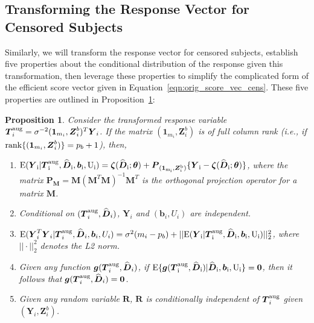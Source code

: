 \documentclass[12pt]{article}
\def\bzero{{\mathbf 0}}
\newcommand{\bzeta}{\mbox{\boldmath $\zeta$}}
\def\btheta{{\boldsymbol{\theta}}}
\def\bzero{{\boldsymbol{0}}}
\def\bone{{\boldsymbol{1}}}
\def\bb{{\boldsymbol b}}
\def\bg{{\boldsymbol g}}
\def\bD{{\boldsymbol D}}
\def\bM{{\boldsymbol M}}
\def\bP{{\boldsymbol P}}
\def\bR{{\boldsymbol R}}
\def\bT{{\boldsymbol T}}
\def\bY{{\boldsymbol Y}}
\def\bZ{{\boldsymbol Z}}
\def\tilD{\bD}
\def\E{\rm E}
\newtheorem{proposition}{Proposition}
\begin{document}
\subsection{Transforming the Response Vector for Censored Subjects}
\label{sec:simplify_score_vector_cens}

Similarly, we will transform the response vector for censored subjects, establish five properties about the conditional distribution of the response given this transformation, then leverage these properties to simplify the complicated form of the efficient score vector given in Equation~\eqref{eqn:orig_score_vec_cens}. These five properties are outlined in Proposition~\ref{prop:three_properties_cens}:
\begin{proposition}
\label{prop:three_properties_cens}
Consider the transformed response variable $\bT_i^{\rm aug}=\sigma^{-2}(\bone_{m_i},\bZ_i^b)^T\bY_i$. If the matrix $(\bone_{m_i},\bZ_i^b)$ is of full column rank (i.e., if ${\rm rank}\{(\bone_{m_i},\bZ_i^b)\}=p_b+1$), then,
\begin{enumerate}
    \item[$\rm{P1}^*$] $\rm{E}(\bY_i|\bT_i^{\rm aug},\widehat{\tilD}_i,\bb_i,U_i)=\bzeta(\widehat{\tilD}_i;\btheta)+\bP_{(\bone_{m_i},\bZ_i^b)}\{\bY_i-\bzeta(\widehat{\tilD}_i;\btheta)\}$, where the matrix $\bP_{\bM} = \bM(\bM^T\bM)^{-1}\bM^T$ is the orthogonal projection operator for a matrix $\bM$.
    \item[$\rm{P2}^*$] Conditional on $(\bT_i^{\rm aug},\widehat{\tilD}_i)$, $\bY_i$ and $(\bb_i,U_i)$ are independent.
    \item[${\rm P3}^*$] ${\rm E}(\bY_i^T\bY_i|\bT_i^{\rm aug},\widehat{\tilD}_i,\bb_i,U_i)=\sigma^2(m_i-p_b)+||\rm{E}(\bY_i|\bT_i^{\rm aug},\widehat{\tilD}_i,\bb_i,U_i)||^2_2$, where $||\cdot||^2_2$ denotes the L2 norm.
    \item[${\rm P4}^*$] Given any function $\bg(\bT_i^{\rm aug},\widehat{\tilD}_i)$, if $\E\{\bg(\bT_i^{\rm aug},\widehat{\tilD}_i)|\widehat{\tilD}_i,\bb_i,U_i\}=\bzero$, then it follows that $\bg(\bT_i^{\rm aug},\widehat{\tilD}_i)=\bzero$.
    \item[${\rm P5}^*$] Given any random variable $\bR$, $\bR$ is conditionally independent of $\bT_i^{\rm aug}$ given $(\bY_i, \bZ_i^b)$.
\end{enumerate}
\end{proposition}
\end{document}
